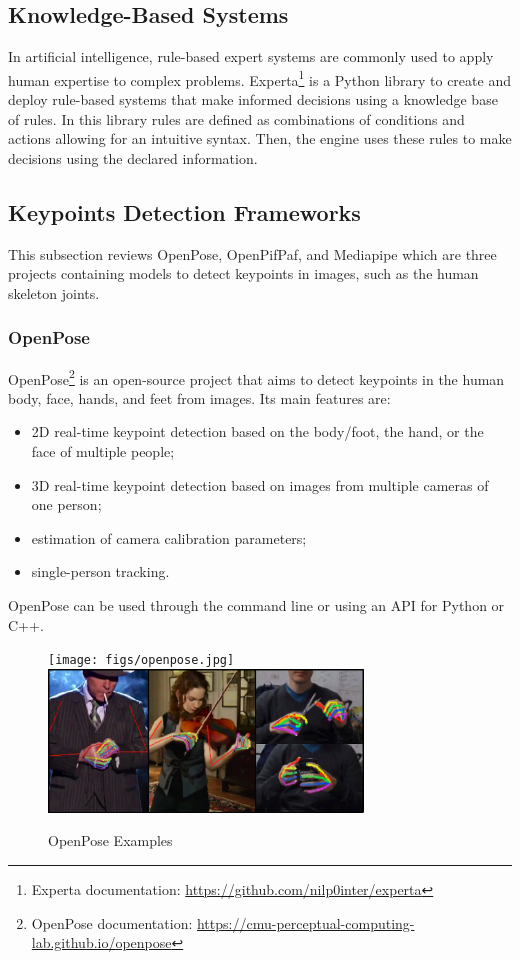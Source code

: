 \subsection{Knowledge-Based Systems}

In artificial intelligence, rule-based expert systems are commonly used to apply human expertise to complex problems. Experta\footnote{Experta documentation: \url{https://github.com/nilp0inter/experta}} is a Python library to create and deploy rule-based systems that make informed decisions using a knowledge base of rules. In this library rules are defined as combinations of conditions and actions allowing for an intuitive syntax. Then, the engine uses these rules to make decisions using the declared information.

\subsection{Keypoints Detection Frameworks}
\label{subsection:keypointdetection}

This subsection reviews OpenPose, OpenPifPaf, and Mediapipe which are three projects containing models to detect keypoints in images, such as the human skeleton joints.

\subsubsection{OpenPose}

OpenPose\cite{Cao2021,Simon2017,Cao2018,Wei2016}\footnote{OpenPose documentation: \url{https://cmu-perceptual-computing-lab.github.io/openpose}} is an open-source project that aims to detect keypoints in the human body, face, hands, and feet from images. Its main features are:
\begin{itemize}
    \item 2D real-time keypoint detection based on the body/foot, the hand, or the face of multiple people;
    \item 3D real-time keypoint detection based on images from multiple cameras of one person;
    \item estimation of camera calibration parameters;
    \item single-person tracking.
\end{itemize}

OpenPose can be used through the command line or using an API for Python or C++.

\begin{figure}[ht]
    \centerline{\texttt{[image: figs/openpose.jpg]} \includegraphics[height=1.5in]{figs/openpose2.jpg}}
    \caption[OpenPose Examples]{OpenPose Examples \cite{Cao2021,Simon2017}}
    \label{fig:openpose}
\end{figure}

